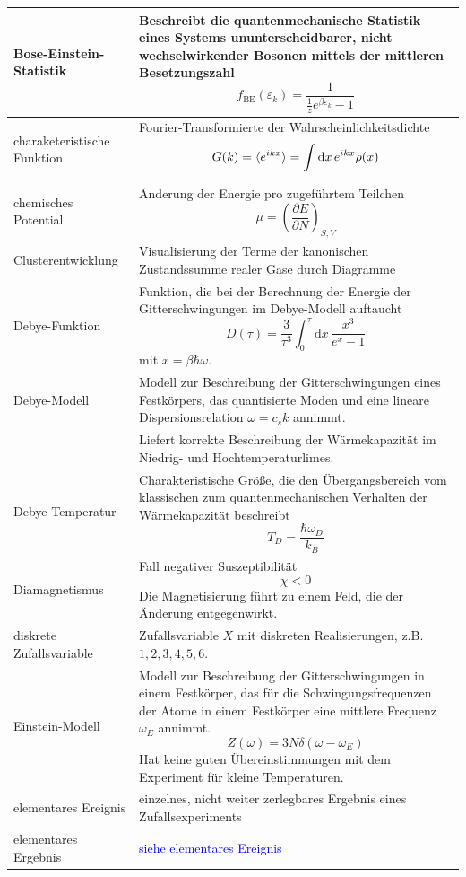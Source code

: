 \documentclass{article}
\newcommand{\diff}{\mathrm{d}}
\newcommand{\lr}[1]{\left(#1\right)}
\begin{document}
\begin{xltabular}{\linewidth}{p{6cm}|X}
	\hline
		Bose-Einstein-Statistik & Beschreibt die quantenmechanische Statistik eines Systems ununterscheidbarer, nicht wechselwirkender Bosonen mittels der mittleren Besetzungszahl
			$$f_{\text{BE}}(\varepsilon_{k}) = \frac{1}{\frac{1}{z}e^{\beta\varepsilon_k} - 1}$$ \\
	\hline
		charaketeristische Funktion & Fourier-Transformierte der Wahrscheinlichkeitsdichte
			$$G(k) = \braket{e^{ikx}} = \int \diff x\, e^{ikx} \rho(x)$$ \\
	\hline
		chemisches Potential & Änderung der Energie pro zugeführtem Teilchen
			$$\mu = \lr{ \frac{\partial E}{\partial N} }_{S,V}$$ \\
	\hline
		Clusterentwicklung & Visualisierung der Terme der kanonischen Zustandssumme realer Gase durch Diagramme \\
	\hline
		Debye-Funktion & Funktion, die bei der Berechnung der Energie der Gitterschwingungen im Debye-Modell auftaucht
			$$D(\tau) = \frac{3}{\tau^3} \int_0^{\tau} \diff x\, \frac{x^3}{e^x - 1}$$
		mit $x = \beta\hbar\omega$. \\
	\hline
		Debye-Modell & Modell zur Beschreibung der Gitterschwingungen eines Festkörpers, das quantisierte Moden und eine lineare Dispersionsrelation $\omega = c_s k$ annimmt.\\
		& Liefert korrekte Beschreibung der Wärmekapazität im Niedrig- und Hochtemperaturlimes. \\
	\hline
		Debye-Temperatur & Charakteristische Größe, die den Übergangsbereich vom klassischen zum quantenmechanischen Verhalten der Wärmekapazität beschreibt
			$$T_D = \frac{\hbar\omega_D}{k_B}$$ \\
	\hline
		Diamagnetismus & Fall negativer Suszeptibilität
			$$\chi < 0$$
		Die Magnetisierung führt zu einem Feld, die der Änderung entgegenwirkt. \\
	\hline
		diskrete Zufallsvariable & Zufallsvariable $X$ mit diskreten Realisierungen, z.B. $1,2,3,4,5,6$. \\
	\hline
		Einstein-Modell & Modell zur Beschreibung der Gitterschwingungen in einem Festkörper, das für die Schwingungsfrequenzen der Atome in einem Festkörper eine mittlere Frequenz $\omega_E$ annimmt.
			$$Z(\omega) = 3N \delta(\omega-\omega_E)$$
		Hat keine guten Übereinstimmungen mit dem Experiment für kleine Temperaturen. \\
	\hline
		elementares Ereignis & einzelnes, nicht weiter zerlegbares Ergebnis eines Zufallsexperiments \\
	\hline
		elementares Ergebnis & \textcolor{blue}{siehe elementares Ereignis} \\

\end{xltabular}
\end{document}
